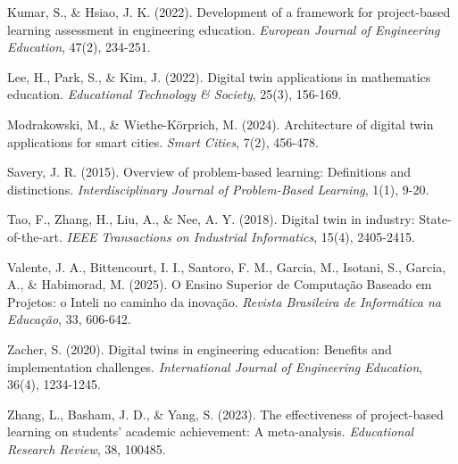 \documentclass[english, spanish, brazilian]{modelo_dt}
\begin{document}
\noindent
Kumar, S., \& Hsiao, J. K. (2022). Development of a framework for project-based learning assessment in engineering education. \textit{European Journal of Engineering Education}, 47(2), 234-251.

\noindent
Lee, H., Park, S., \& Kim, J. (2022). Digital twin applications in mathematics education. \textit{Educational Technology \& Society}, 25(3), 156-169.

\noindent
Modrakowski, M., \& Wiethe-Körprich, M. (2024). Architecture of digital twin applications for smart cities. \textit{Smart Cities}, 7(2), 456-478.

\noindent
Savery, J. R. (2015). Overview of problem-based learning: Definitions and distinctions. \textit{Interdisciplinary Journal of Problem-Based Learning}, 1(1), 9-20.

\noindent
Tao, F., Zhang, H., Liu, A., \& Nee, A. Y. (2018). Digital twin in industry: State-of-the-art. \textit{IEEE Transactions on Industrial Informatics}, 15(4), 2405-2415.

\noindent
Valente, J. A., Bittencourt, I. I., Santoro, F. M., Garcia, M., Isotani, S., Garcia, A., \& Habimorad, M. (2025). O Ensino Superior de Computação Baseado em Projetos: o Inteli no caminho da inovação. \textit{Revista Brasileira de Informática na Educação}, 33, 606-642.

\noindent
Zacher, S. (2020). Digital twins in engineering education: Benefits and implementation challenges. \textit{International Journal of Engineering Education}, 36(4), 1234-1245.

\noindent
Zhang, L., Basham, J. D., \& Yang, S. (2023). The effectiveness of project-based learning on students' academic achievement: A meta-analysis. \textit{Educational Research Review}, 38, 100485.
\end{document}
